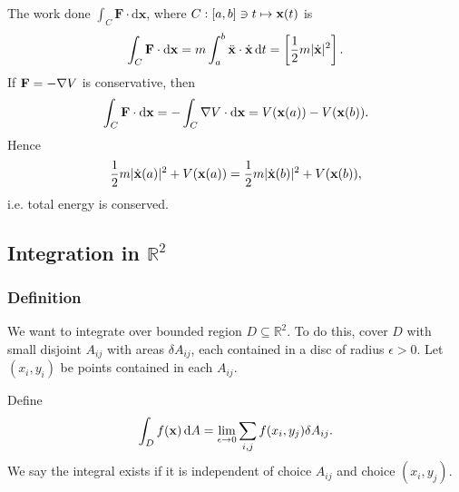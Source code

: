 \begin{example}
    The work done $ \int_{C} \mathbf{F} \cdot\mathrm{d}\mathbf{x} $, where $ C:[a,b]\ni t\mapsto {\bf x}(t) $ is 
    \[
        \int_{C} \mathbf{F} \cdot\mathrm{d}\mathbf{x}= m \int_{a}^{b} \ddot{{\bf x}}\cdot \dot{{\bf x}} \,\mathrm{d}t = \left[ \frac{1}{2}m |\dot{{\bf x}}|^2 \right].
    \]
    If ${\bf F} = -\nabla V$ is conservative, then 
    \[
        \int_{C} \mathbf{F} \cdot\mathrm{d}\mathbf{x} = - \int_{C} \nabla V \cdot\mathrm{d}\mathbf{x} = V({\bf x}(a))-V({\bf x}(b)).
    \]
    Hence
    \[
        \frac{1}{2}m |\dot{{\bf x}}(a)|^2+V({\bf x}(a))=\frac{1}{2}m |\dot{{\bf x}}(b)|^2+V({\bf x}(b)),
    \]
    i.e. total energy is conserved.
\end{example}

\subsection{Integration in $ \mathbb{R}^{2} $}
\subsubsection{Definition}
We want to integrate over bounded region $ D \subseteq \mathbb{R}^{2} $. To do this, cover $D$ with small disjoint $A_{ij}$ with areas $ \delta A_{ij} $, each contained in a disc of radius $ \epsilon>0 $. Let $ (x_i,y_i) $ be points contained in each $A_{ij}$.
\begin{center}
\end{center}

\begin{definition}
    Define 
    \[
        \int_{D} f({\bf x}) \,\mathrm{d}A = \lim_{\epsilon \to 0} \sum_{i,j} f(x_i,y_j) \delta A_{ij}.
    \]
    We say the integral exists if it is independent of choice $A_{ij}$ and choice $ (x_i,y_j) $.
\end{definition}

